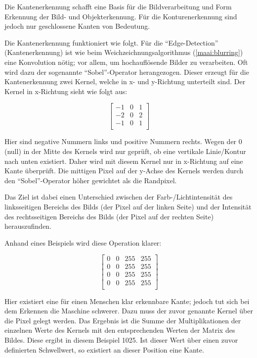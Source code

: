 Die Kantenerkennung schafft eine Basis für die Bildverarbeitung und Form Erkennung der Bild- und Objekterkennung. Für die Konturenerkennung sind jedoch nur geschlossene Kanten von Bedeutung.

Die Kantenerkennung funktioniert wie folgt. Für die ``Edge-Detection'' (Kantenerkennung) ist wie beim Weichzeichnungsalgorithmus (\ref{maai:blurring}) eine Konvolution nötig; vor allem, um hochauflösende Bilder zu verarbeiten. Oft wird dazu der sogenannte ``Sobel''-Operator herangezogen. Dieser erzeugt für die Kantenerkennung zwei Kernel, welche in x- und y-Richtung unterteilt sind. Der Kernel in x-Richtung sieht wie folgt aus:

\[
  \left[\begin{array}{rrr}
      -1 & 0 & 1 \\
      -2 & 0 & 2 \\
      -1 & 0 & 1 \\
    \end{array}\right]
\]


Hier sind negative Nummern links und positive Nummern rechts. Wegen der 0 (null) in der Mitte des Kernels wird nur geprüft, ob eine vertikale Linie/Kontur nach unten existiert. Daher wird mit diesem Kernel nur in x-Richtung auf eine Kante überprüft. Die mittigen Pixel auf der y-Achse des Kernels werden durch den ``Sobel''-Operator höher gewichtet als die Randpixel.

Das Ziel ist dabei einen Unterschied zwischen der Farb-/Lichtintensität des linksseitigen Bereichs des Bilds (der Pixel auf der linken Seite) und der Intensität des rechtsseitigen Bereichs des Bilds (der Pixel auf der rechten Seite) herauszufinden.

Anhand eines Beispiels wird diese Operation klarer:

\[
  \left[\begin{array}{rrrr}
      0 & 0 & 255 & 255 \\
      0 & 0 & 255 & 255 \\
      0 & 0 & 255 & 255 \\
      0 & 0 & 255 & 255 \\
    \end{array}\right]
\]

Hier existiert eine für einen Menschen klar erkennbare Kante; jedoch tut sich bei dem Erkennen die Maschine schwerer. Dazu muss der zuvor genannte Kernel über die Pixel gelegt werden. Das Ergebnis ist die Summe der Multiplikationen der einzelnen Werte des Kernels mit den entsprechenden Werten der Matrix des Bildes. Diese ergibt in diesem Beispiel 1025. Ist dieser Wert über einen zuvor definierten Schwellwert, so existiert an dieser Position eine Kante.

